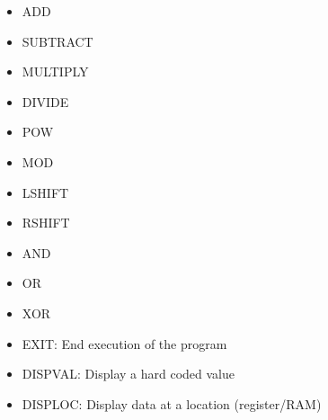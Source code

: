 \documentclass[12pt]{article}
\begin{document}
\begin{itemize}
\item
ADD

\item
SUBTRACT

\item
MULTIPLY

\item
DIVIDE

\item
POW

\item
MOD

\item
LSHIFT

\item
RSHIFT

\item
AND

\item
OR

\item
XOR

\item
EXIT: End execution of the program

\item
DISPVAL: Display a hard coded value

\item
DISPLOC: Display data at a location (register/RAM)

\end{itemize}
\end{document}
